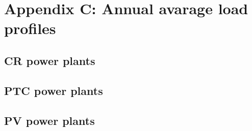 \chapter{Appendix C: Annual avarage load profiles} \label{all_load_profile}
\section{CR power plants}

\section{PTC power plants}

\section{PV power plants}
\pagebreak